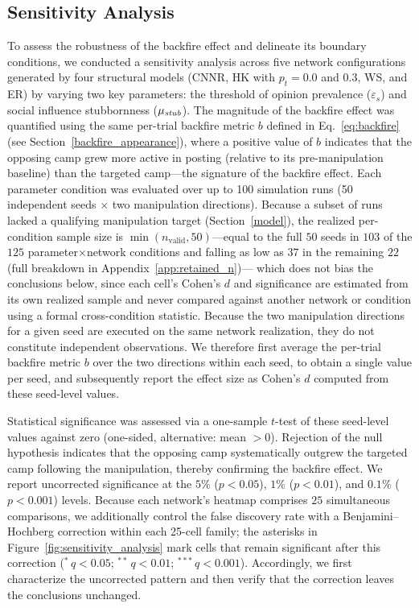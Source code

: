 \documentclass[pdflatex,sn-mathphys-num]{sn-jnl}%
\theoremstyle{thmstyleone}%
\theoremstyle{thmstyletwo}%
\theoremstyle{thmstylethree}%
\def\Stubbornness{\mu_{\it stub}}
\def\ThofOpPreval{\varepsilon_s}
\begin{document}
\subsection{Sensitivity Analysis}\label{sensitivity}
To assess the robustness of the backfire effect and delineate its
boundary conditions, we conducted a sensitivity analysis across five network configurations generated by four
structural models (CNNR, HK with $p_t {=} 0.0$ and $0.3$, WS, and ER)
by varying two key parameters:
the threshold of opinion prevalence ($\ThofOpPreval$) and
social influence stubbornness ($\Stubbornness$).
The magnitude of the backfire effect was quantified using
the same per-trial backfire metric $b$ defined in
Eq.~\eqref{eq:backfire} (see Section~\ref{backfire_appearance}),
where a positive value of $b$ indicates that the opposing camp
grew more active in posting (relative to its pre-manipulation baseline)
than the targeted camp---the signature of the backfire effect.
Each parameter condition was evaluated over up to 100 simulation runs
(50 independent seeds $\times$ two manipulation directions).
Because a subset of runs lacked a qualifying manipulation target (Section~\ref{model}),
the realized per-condition sample size is $\min(n_{\text{valid}},50)$---equal to the
full $50$ seeds in $103$ of the $125$ parameter$\times$network conditions and falling
as low as $37$ in the remaining $22$ (full breakdown in Appendix~\ref{app:retained_n})---
which does not bias the conclusions below, since each cell's Cohen's $d$ and
significance are estimated from its own realized sample and never compared against
another network or condition using a formal cross-condition statistic.
Because the two manipulation directions for a given seed are executed on the
same network realization, they do not constitute independent observations.
We therefore first average the per-trial backfire metric $b$ over the two
directions within each seed, to obtain a single value per seed, and
subsequently report the effect size as Cohen's $d$ computed from these seed-level
values.
\par

Statistical significance was assessed via a one-sample $t$-test
of these seed-level values against zero (one-sided, alternative: mean $> 0$).
Rejection of the null hypothesis indicates that the
opposing camp systematically outgrew the targeted camp
following the manipulation, thereby confirming the backfire effect.
We report uncorrected significance at the $5\%$ ($p < 0.05$),
$1\%$ ($p < 0.01$), and $0.1\%$ ($p < 0.001$) levels.
Because each network's heatmap comprises $25$ simultaneous comparisons,
we additionally control the false discovery rate with a Benjamini--Hochberg
correction within each 25-cell family; the asterisks in
Figure~\ref{fig:sensitivity_analysis} mark cells that remain significant
after this correction ($^{*}\,q<0.05$; $^{**}\,q<0.01$; $^{***}\,q<0.001$).
Accordingly, we first characterize the uncorrected pattern and then verify
that the correction leaves the conclusions unchanged.
\par
\end{document}
